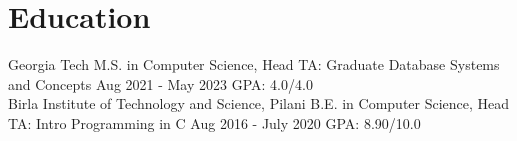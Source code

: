 \vspace{-2.5mm}
\section{Education}

\resumeSubHeadingListStart
\resumeEdu
{Georgia Tech} 
{M.S. in Computer Science, Head TA: Graduate Database Systems and Concepts} 
{Aug 2021 - May 2023}
{GPA: 4.0/4.0}
\\
\resumeEdu
{Birla Institute of Technology and Science, Pilani} 
{B.E. in Computer Science, Head TA: Intro Programming in C} 
{Aug 2016 - July 2020}
{GPA: 8.90/10.0}

\resumeSubHeadingListEnd
\vspace{-3.5mm}